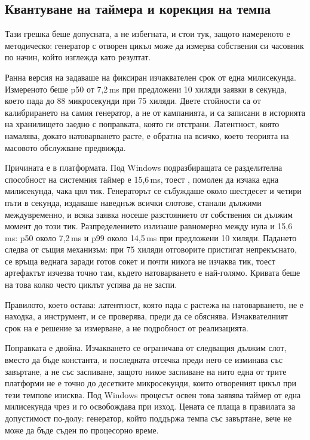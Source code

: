 \subsection{Квантуване на таймера и корекция на темпа}

Тази грешка беше допусната, а не избегната, и стои тук, защото намереното е методическо:
генератор с отворен цикъл може да измерва собствения си часовник по начин, който изглежда
като резултат.

Ранна версия на  задаваше на  фиксиран изчаквателен срок от една
милисекунда. Измереното беше p50 от 7,2\,ms при предложени 10 хиляди заявки в секунда, което
пада до 88 микросекунди при 75 хиляди. Двете стойности са от калибрирането на самия
генератор, а не от кампанията, и са записани в историята на хранилището заедно с поправката,
която ги отстрани. Латентност, която намалява, докато натоварването расте,
е обратна на всичко, което теорията на масовото обслужване предвижда.

Причината е в платформата. Под Windows подразбиращата се разделителна способност на системния
таймер е 15,6\,ms, тоест , помолен да изчака една милисекунда, чака цял тик.
Генераторът се събуждаше около шестдесет и четири пъти в секунда, издаваше наведнъж всички
слотове,
станали дължими междувременно, и всяка заявка носеше разстоянието от собствения си дължим
момент до този тик. Разпределението излизаше равномерно между нула и 15,6\,ms: p50 около
7,2\,ms и p99 около 14,5\,ms при предложени 10 хиляди. Падането следва от същия механизъм: при
75 хиляди отговорите пристигат непрекъснато,  се връща веднага заради готов сокет и
почти никога не изчаква тик, тоест артефактът изчезва точно там, където натоварването е
най-голямо. Кривата беше на това колко често циклът успява да не заспи.

Правилото, което остава: латентност, която пада с растежа на натоварването, не е находка, а
инструмент, и се проверява, преди да се обяснява. Изчаквателният срок на  е решение
за измерване, а не подробност от реализацията.

Поправката е двойна. Изчакването се ограничава от следващия дължим слот, вместо да бъде
константа, и последната отсечка преди него се изминава със завъртане, а не със заспиване,
защото никое заспиване на нито една от трите платформи не е точно до десетките микросекунди,
които отвореният цикъл при тези темпове изисква. Под Windows процесът освен това заявява таймер
от една милисекунда чрез  и го освобождава при изход. Цената се плаща в
правилата за допустимост по-долу: генератор, който поддържа темпа със завъртане, вече не може
да бъде съден по процесорно време.

